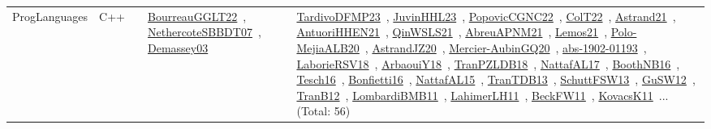 {\begin{longtable}{lp{3cm}>{\raggedright\arraybackslash}p{6cm}>{\raggedright\arraybackslash}p{6cm}>{\raggedright\arraybackslash}p{8cm}}
ProgLanguages & C++ &  & \href{works/BourreauGGLT22.pdf}{BourreauGGLT22}~\cite{BourreauGGLT22}, \href{works/NethercoteSBBDT07.pdf}{NethercoteSBBDT07}~\cite{NethercoteSBBDT07}, \href{works/Demassey03.pdf}{Demassey03}~\cite{Demassey03} & \href{works/TardivoDFMP23.pdf}{TardivoDFMP23}~\cite{TardivoDFMP23}, \href{works/JuvinHHL23.pdf}{JuvinHHL23}~\cite{JuvinHHL23}, \href{works/PopovicCGNC22.pdf}{PopovicCGNC22}~\cite{PopovicCGNC22}, \href{works/ColT22.pdf}{ColT22}~\cite{ColT22}, \href{works/Astrand21.pdf}{Astrand21}~\cite{Astrand21}, \href{works/AntuoriHHEN21.pdf}{AntuoriHHEN21}~\cite{AntuoriHHEN21}, \href{works/QinWSLS21.pdf}{QinWSLS21}~\cite{QinWSLS21}, \href{works/AbreuAPNM21.pdf}{AbreuAPNM21}~\cite{AbreuAPNM21}, \href{works/Lemos21.pdf}{Lemos21}~\cite{Lemos21}, \href{works/Polo-MejiaALB20.pdf}{Polo-MejiaALB20}~\cite{Polo-MejiaALB20}, \href{works/AstrandJZ20.pdf}{AstrandJZ20}~\cite{AstrandJZ20}, \href{works/Mercier-AubinGQ20.pdf}{Mercier-AubinGQ20}~\cite{Mercier-AubinGQ20}, \href{works/abs-1902-01193.pdf}{abs-1902-01193}~\cite{abs-1902-01193}, \href{works/LaborieRSV18.pdf}{LaborieRSV18}~\cite{LaborieRSV18}, \href{works/ArbaouiY18.pdf}{ArbaouiY18}~\cite{ArbaouiY18}, \href{works/TranPZLDB18.pdf}{TranPZLDB18}~\cite{TranPZLDB18}, \href{works/NattafAL17.pdf}{NattafAL17}~\cite{NattafAL17}, \href{works/BoothNB16.pdf}{BoothNB16}~\cite{BoothNB16}, \href{works/Tesch16.pdf}{Tesch16}~\cite{Tesch16}, \href{works/Bonfietti16.pdf}{Bonfietti16}~\cite{Bonfietti16}, \href{works/NattafAL15.pdf}{NattafAL15}~\cite{NattafAL15}, \href{works/TranTDB13.pdf}{TranTDB13}~\cite{TranTDB13}, \href{works/SchuttFSW13.pdf}{SchuttFSW13}~\cite{SchuttFSW13}, \href{works/GuSW12.pdf}{GuSW12}~\cite{GuSW12}, \href{works/TranB12.pdf}{TranB12}~\cite{TranB12}, \href{works/LombardiBMB11.pdf}{LombardiBMB11}~\cite{LombardiBMB11}, \href{works/LahimerLH11.pdf}{LahimerLH11}~\cite{LahimerLH11}, \href{works/BeckFW11.pdf}{BeckFW11}~\cite{BeckFW11}, \href{works/KovacsK11.pdf}{KovacsK11}~\cite{KovacsK11}... (Total: 56)\\

\end{longtable}}
